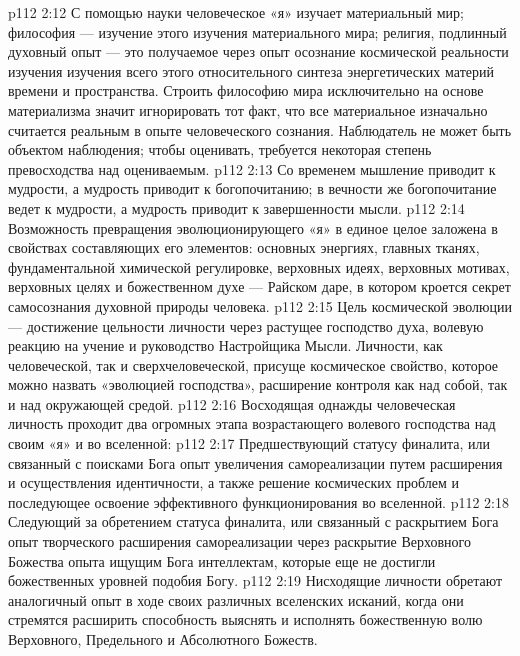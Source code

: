 \vs p112 2:12 С помощью науки человеческое «я» изучает материальный мир; философия --- изучение этого изучения материального мира; религия, подлинный духовный опыт --- это получаемое через опыт осознание космической реальности изучения изучения всего этого относительного синтеза энергетических материй времени и пространства. Строить философию мира исключительно на основе материализма значит игнорировать тот факт, что все материальное изначально считается реальным в опыте человеческого сознания. Наблюдатель не может быть объектом наблюдения; чтобы оценивать, требуется некоторая степень превосходства над оцениваемым.
\vs p112 2:13 Со временем мышление приводит к мудрости, а мудрость приводит к богопочитанию; в вечности же богопочитание ведет к мудрости, а мудрость приводит к завершенности мысли.
\vs p112 2:14 Возможность превращения эволюционирующего «я» в единое целое заложена в свойствах составляющих его элементов: основных энергиях, главных тканях, фундаментальной химической регулировке, верховных идеях, верховных мотивах, верховных целях и божественном духе --- Райском даре, в котором кроется секрет самосознания духовной природы человека.
\vs p112 2:15 Цель космической эволюции --- достижение цельности личности через растущее господство духа, волевую реакцию на учение и руководство Настройщика Мысли. Личности, как человеческой, так и сверхчеловеческой, присуще космическое свойство, которое можно назвать «эволюцией господства», расширение контроля как над собой, так и над окружающей средой.
\vs p112 2:16 \pc Восходящая однажды человеческая личность проходит два огромных этапа возрастающего волевого господства над своим «я» и во вселенной:
\vs p112 2:17 \bibnobreakspace Предшествующий статусу финалита, или связанный с поисками Бога опыт увеличения самореализации путем расширения и осуществления идентичности, а также решение космических проблем и последующее освоение эффективного функционирования во вселенной.
\vs p112 2:18 \bibnobreakspace Следующий за обретением статуса финалита, или связанный с раскрытием Бога опыт творческого расширения самореализации через раскрытие Верховного Божества опыта ищущим Бога интеллектам, которые еще не достигли божественных уровней подобия Богу.
\vs p112 2:19 \pc Нисходящие личности обретают аналогичный опыт в ходе своих различных вселенских исканий, когда они стремятся расширить способность выяснять и исполнять божественную волю Верховного, Предельного и Абсолютного Божеств.
